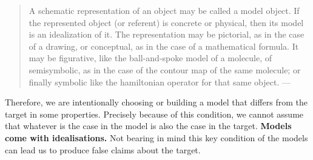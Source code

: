 \documentclass[
]{book}
\begin{document}
\begin{quote}
A schematic representation of an object may be called a model object. If the represented object (or referent) is concrete or physical, then its model is an idealization of it. The representation may be pictorial, as in the case of a drawing, or conceptual, as in the case of a mathematical formula. It may be figurative, like the ball-and-spoke model of a molecule, of semisymbolic, as in the case of the contour map of the same molecule; or finally symbolic like the hamiltonian operator for that same object. --- \citep{bunge2012method}
\end{quote}

Therefore, we are intentionally choosing or building a model that differs from the target in some properties. Precisely because of this condition, we cannot assume that whatever is the case in the model is also the case in the target. \textbf{Models come with idealisations.} Not bearing in mind this key condition of the models can lead us to produce false claims about the target.
\end{document}
